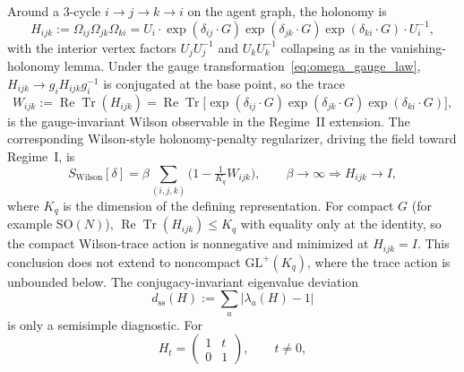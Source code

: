 \documentclass[11pt]{article}
\begin{document}
Around a 3-cycle $i\to j\to k\to i$ on the agent graph, the holonomy is
\begin{equation}
H_{ijk}
:= \Omega_{ij}\Omega_{jk}\Omega_{ki}
= U_i \cdot \exp(\delta_{ij}\cdot G) \exp(\delta_{jk}\cdot G) \exp(\delta_{ki}\cdot G) \cdot U_i^{-1},
\label{eq:discrete_holonomy}
\end{equation}
with the interior vertex factors $U_jU_j^{-1}$ and $U_kU_k^{-1}$ collapsing as in the vanishing-holonomy lemma. Under the gauge transformation~\eqref{eq:omega_gauge_law}, $H_{ijk} \to g_i H_{ijk} g_i^{-1}$ is conjugated at the base point, so the trace
\begin{equation}
W_{ijk} := \operatorname{Re}\operatorname{Tr}(H_{ijk})
= \operatorname{Re}\operatorname{Tr}\big[\exp(\delta_{ij}\cdot G) \exp(\delta_{jk}\cdot G) \exp(\delta_{ki}\cdot G)\big],
\label{eq:wilson_observable}
\end{equation}
is the gauge-invariant Wilson observable in the Regime~II extension. The corresponding Wilson-style holonomy-penalty regularizer, driving the field toward Regime~I, is
\begin{equation}
S_{\mathrm{Wilson}}[\delta]
= \beta \sum_{(i,j,k)} \Big(1 - \tfrac{1}{K_q} W_{ijk}\Big),
\qquad
\beta \to \infty \Longrightarrow H_{ijk} \to I,
\label{eq:wilson_action}
\end{equation}
where $K_q$ is the dimension of the defining representation. For compact $G$ (for example $\mathrm{SO}(N)$), $\operatorname{Re}\operatorname{Tr}(H_{ijk})\le K_q$ with equality only at the identity, so the compact Wilson-trace action is nonnegative and minimized at $H_{ijk}=I$. This conclusion does not extend to noncompact $\mathrm{GL}^+(K_q)$, where the trace action is unbounded below. The conjugacy-invariant eigenvalue deviation
\begin{equation}
d_{\mathrm{ss}}(H):=\sum_a|\lambda_a(H)-1|
\end{equation}
is only a semisimple diagnostic. For
\begin{equation}
H_t=\begin{pmatrix}1&t\\0&1\end{pmatrix},\qquad t\ne0,
\end{equation}
\end{document}

